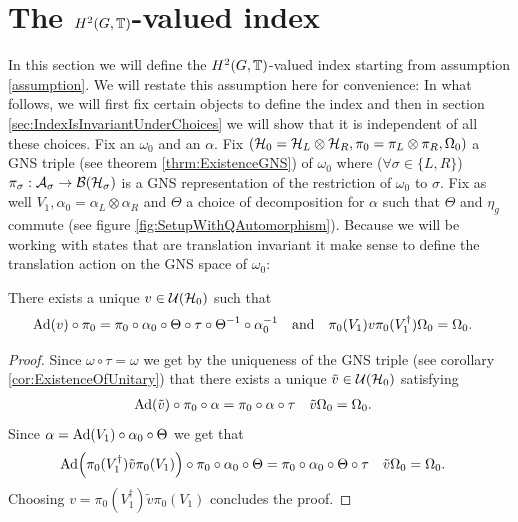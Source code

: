 \documentclass[12pt,a4paper,twoside]{article}
\numberwithin{equation}{section}
\begin{document}
\section{The $H^2(G,\mathbb T)$-valued index}\label{sec:ProofFirstStatement}
In this section we will define the $H^2(G,\mathbb T)$-valued index starting from assumption \ref{assumption}. We will restate this assumption here for convenience:
\assumptionOne*
In what follows, we will first fix certain objects to define the index and then in section \ref{sec:IndexIsInvariantUnderChoices} we will show that it is independent of all these choices. Fix an $\omega_0$ and an $\alpha$. Fix $(\mathcal H_0=\mathcal H_L\otimes\mathcal H_R,\pi_0=\pi_L\otimes\pi_R,\Omega_0)$ a GNS triple (see theorem \ref{thrm:ExistenceGNS}) of $\omega_0$ where ($\forall\sigma\in\{L,R\}$) $\pi_\sigma:\mathcal A_\sigma\rightarrow\mathcal B(\mathcal H_\sigma)$ is a GNS representation of the restriction of $\omega_0$ to $\sigma$. Fix as well $V_1,\alpha_0=\alpha_L\otimes\alpha_R$ and $\Theta$ a choice of decomposition for $\alpha$ such that $\Theta$ and $\eta_g$ commute (see figure \ref{fig:SetupWithQAutomorphism}). Because we will be working with states that are translation invariant it make sense to define the translation action on the GNS space of $\omega_0$:
\begin{lemma}\label{lem:Definition_v}
	There exists a unique $v\in\mathcal U(\mathcal H_0)$ such that
	\begin{align}
		\Ad{v}\circ\pi_0&=\pi_0\circ\alpha_0\circ\Theta\circ\tau\circ\Theta^{-1}\circ\alpha_0^{-1}&&\text{and}&\pi_0(V_1)v\pi_0(V_1^\dagger)\Omega_0&=\Omega_0.
	\end{align}
\end{lemma}
\begin{proof}
	Since $\omega\circ\tau=\omega$ we get by the uniqueness of the GNS triple (see corollary \ref{cor:ExistenceOfUnitary}) that there exists a unique $\tilde{v}\in\mathcal U(\mathcal H_0)$ satisfying
	\begin{align}
		\Ad{\tilde{v}}\circ\pi_0\circ\alpha&=\pi_0\circ\alpha\circ\tau&\tilde{v}\Omega_0&=\Omega_0.
	\end{align}
	Since $\alpha=\Ad{V_1}\circ\alpha_0\circ\Theta$ we get that
	\begin{align}
		\Ad{\pi_0(V_1^\dagger)\tilde{v}\pi_0(V_1)}\circ\pi_0\circ\alpha_0\circ\Theta&=\pi_0\circ\alpha_0\circ\Theta\circ\tau&\tilde{v}\Omega_0&=\Omega_0.
	\end{align}
	Choosing $v=\pi_0(V_1^\dagger)\tilde{v}\pi_0(V_1)$  concludes the proof.
\end{proof}
\end{document}
